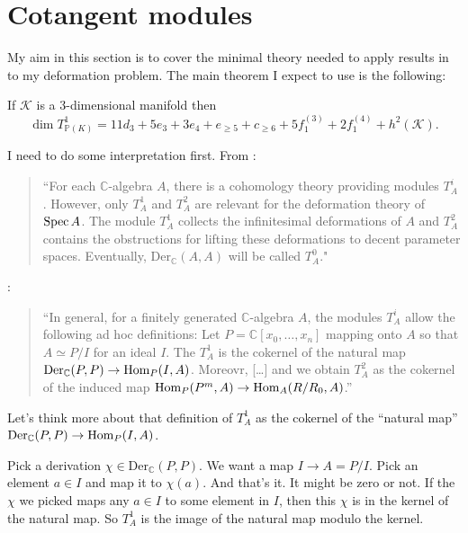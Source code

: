 \section{Cotangent modules}
\label{section-cotangent-modules}

\noindent
My aim in this section is to cover the
minimal
theory needed to apply results in \cite{jan2}
to my deformation problem. The main theorem
I expect to use is the following:

\begin{theorem}
\label{theorem-deformations-threefolds}
\begin{reference}
\cite[Theorem 5.7]{jan2}
\end{reference}
If $\mathcal{K}$ is a 3-dimensional manifold
then
$$
\dim T^1_{\mathbb{P}(K)}
=11d_3+5e_3+3e_4+e_{\geq 5}+c_{\geq
6}+5f_1^{(3)}+2f_1^{(4)}+h^2(\mathcal{K}).
$$
\end{theorem}

\noindent
I need to do some interpretation first.
From \cite[p. 1]{jan3}:

\begin{quotation}
  ``For each $\mathbb{C}$-algebra $A$,
there is a cohomology theory providing
modules $T^i_A$.
However, only $T^1_A$ and $T^2_A$ are
relevant for the deformation
theory of $\mathop{\mathrm{Spec}} A$. The module $T^1_A$
collects the infinitesimal
deformations of $A$ and $T^2_A$ contains the
obstructions
for lifting these deformations to decent
parameter spaces.
Eventually, $\text{Der}_{\mathbb{C}}(A,A)$
will be called $T_A^0$."
\end{quotation}

\cite[p. 3]{jan3}:
\begin{quotation}
``In general, for a finitely generated
$\mathbb{C}$-algebra $A$,
the modules $T_A^i$ allow the following ad
hoc definitions:
Let $P=\mathbb{C}[x_0,…,x_n]$ mapping onto
$A$ so that $A \simeq P/I$
for an ideal $I$. The $T_A^1$ is the cokernel
of the natural map
$\text{Der}_{\mathbb{C}}(P,P) \to
\mathop{\mathrm{Hom}}\nolimits_P(I,A)$.
Moreovr, […] and we obtain $T^2_A$ as the
cokernel
of the induced map
$\mathop{\mathrm{Hom}}\nolimits_P(P^m,A)\to\mathop{\mathrm{Hom}}\nolimits_A(R/R_0,A)$.''
\end{quotation}

\begin{remark}[dani]
\label{remark-dani1}
Let's think more about that definition of
$T^1_A$
as the cokernel of the ``natural map''
$\text{Der}_\mathbb{C}(P,P) \to \mathop{\mathrm{Hom}}\nolimits_P(I,A)$.

Pick a derivation $\chi \in
\text{Der}_{\mathbb{C}}(P,P)$.
We want a map $I \to A=P/I$.
Pick an element $a \in I$ and map it to
$\chi(a)$.
And that's it. It might be zero or not.
If the $\chi$ we picked maps any $a \in I$ to
some element in $I$,
then this $\chi$ is in the kernel of the
natural map.
So $T^1_A$ is the image of the natural map
modulo the kernel.
\end{remark}

